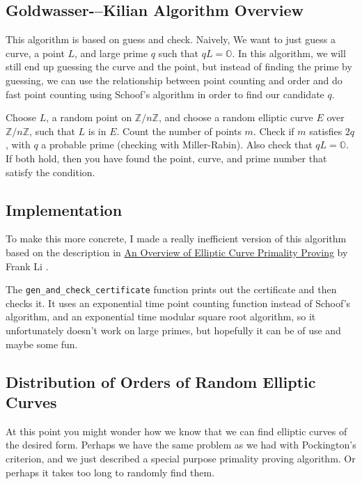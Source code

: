 \documentclass[]{article}
\newcommand{\Z}{\mathbb{Z}}
\newcommand{\OS}{\mathbb{O}}
\newcommand{\ZMZ}[1]{\Z/#1\Z}
\begin{document}
\subsection{Goldwasser-–Kilian Algorithm Overview}

This algorithm is based on guess and check. Naively, We want to just guess a curve, a point $L$, and large prime $q$ such that $qL = \OS$. In this algorithm, we will still end up guessing the curve and the point, but instead of finding the prime by guessing, we can use the relationship between point counting and order and do fast point counting using Schoof's algorithm in order to find our candidate $q$.

Choose $L$, a random point on  $\ZMZ{n}$, and choose a random elliptic curve $E$ over $\ZMZ{n}$, such that $L$ is in $E$. Count the number of points $m$. Check if $m$ satisfies $2q$, with $q$ a probable prime (checking with Miller-Rabin). Also check that $qL = \OS$. If both hold, then you have found the point, curve, and prime number that satisfy the condition.


\subsection{Implementation}

To make this more concrete, I made a really inefficient version of this algorithm based on the description in \underline{An Overview of Elliptic Curve Primality Proving} by Frank Li \cite{StanfordAlgo}.

The \texttt{gen\_and\_check\_certificate} function prints out the certificate and then checks it. It uses an exponential time point counting function instead of Schoof's algorithm, and an exponential time modular square root algorithm, so it unfortunately doesn't work on large primes, but hopefully it can be of use and maybe some fun.


\subsection{Distribution of Orders of Random Elliptic Curves}


At this point you might wonder how we know that we can find elliptic curves of the desired form. Perhaps we have the same problem as we had with Pockington's criterion, and we just described a special purpose primality proving algorithm. Or perhaps it takes too long to randomly find them.
\end{document}
